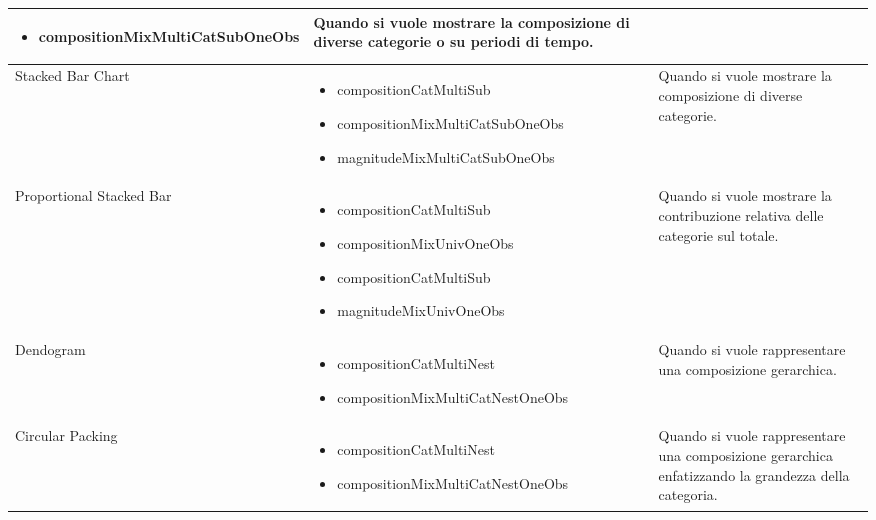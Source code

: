 \begin{xltabular}{\columnwidth}{|p{0.15\columnwidth}|X|p{0.27\columnwidth}|}
\begin{itemize}[noitemsep,topsep=0pt, left=0pt]
        \item compositionMixMultiCatSubOneObs
    \end{itemize} & 
    Quando si vuole mostrare la composizione di diverse categorie o su periodi di tempo. \\
    \hline
    Stacked Bar Chart & 
    \vspace{-3.5mm}
    \begin{itemize}[noitemsep,topsep=0pt, left=0pt]
        \item compositionCatMultiSub
        \item compositionMixMultiCatSubOneObs
        \item magnitudeMixMultiCatSubOneObs
    \end{itemize} & 
    Quando si vuole mostrare la composizione di diverse categorie. \\
    \hline
    Proportional Stacked Bar & 
    \vspace{-3.5mm}
    \begin{itemize}[noitemsep,topsep=0pt, left=0pt]
        \item compositionCatMultiSub
        \item compositionMixUnivOneObs
        \item compositionCatMultiSub
        \item magnitudeMixUnivOneObs
    \end{itemize} & 
    Quando si vuole mostrare la contribuzione relativa delle categorie sul totale. \\
    \hline
    Dendogram & 
    \vspace{-3.5mm}
    \begin{itemize}[noitemsep,topsep=0pt, left=0pt]
        \item compositionCatMultiNest
        \item compositionMixMultiCatNestOneObs
    \end{itemize} & 
    Quando si vuole rappresentare una composizione gerarchica. \\
    \hline
    Circular Packing & 
    \vspace{-3.5mm}
    \begin{itemize}[noitemsep,topsep=0pt, left=0pt]
        \item compositionCatMultiNest
        \item compositionMixMultiCatNestOneObs
    \end{itemize} & 
    Quando si vuole rappresentare una composizione gerarchica enfatizzando la grandezza della categoria. \\

\end{xltabular}
